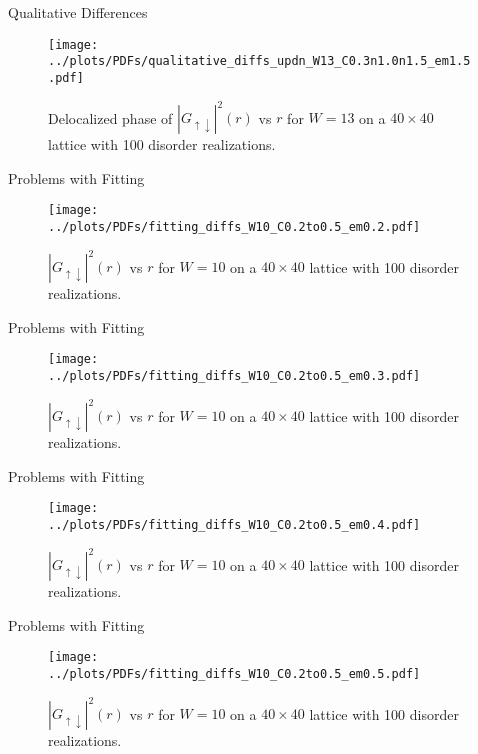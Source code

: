 \documentclass[]{beamer}
\begin{document}
\begin{frame}{Qualitative Differences}
    \begin{figure}
        \centering
        \texttt{[image: ../plots/PDFs/qualitative\_diffs\_updn\_W13\_C0.3n1.0n1.5\_em1.5.pdf]}
        \caption{Delocalized phase of $|G_{\uparrow\downarrow}|^2(r)$ vs $r$ for $W = 13$ on a $40\times40$
                lattice with 100 disorder realizations.}
    \end{figure}        
\end{frame}

\begin{frame}{Problems with Fitting}
    \begin{figure}
        \centering
        \texttt{[image: ../plots/PDFs/fitting\_diffs\_W10\_C0.2to0.5\_em0.2.pdf]}
        \caption{$|G_{\uparrow\downarrow}|^2(r)$ vs $r$ for $W = 10$ on a $40\times40$ lattice with 100 disorder realizations.}
    \end{figure}        
\end{frame}

\begin{frame}{Problems with Fitting}
    \begin{figure}
        \centering
        \texttt{[image: ../plots/PDFs/fitting\_diffs\_W10\_C0.2to0.5\_em0.3.pdf]}
        \caption{$|G_{\uparrow\downarrow}|^2(r)$ vs $r$ for $W = 10$ on a $40\times40$ lattice with 100 disorder realizations.}
    \end{figure}        
\end{frame}

\begin{frame}{Problems with Fitting}
    \begin{figure}
        \centering
        \texttt{[image: ../plots/PDFs/fitting\_diffs\_W10\_C0.2to0.5\_em0.4.pdf]}
        \caption{$|G_{\uparrow\downarrow}|^2(r)$ vs $r$ for $W = 10$ on a $40\times40$ lattice with 100 disorder realizations.}
    \end{figure}        
\end{frame}

\begin{frame}{Problems with Fitting}
    \begin{figure}
        \centering
        \texttt{[image: ../plots/PDFs/fitting\_diffs\_W10\_C0.2to0.5\_em0.5.pdf]}
        \caption{$|G_{\uparrow\downarrow}|^2(r)$ vs $r$ for $W = 10$ on a $40\times40$ lattice with 100 disorder realizations.}
    \end{figure}        
\end{frame}
\end{document}
